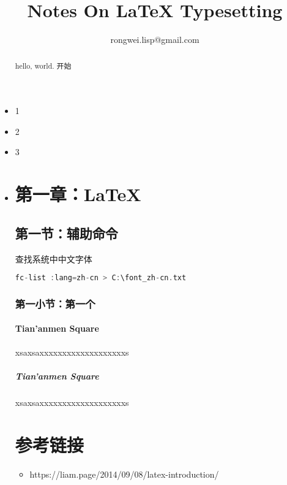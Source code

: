 \documentclass[UTF8]{ctexart}
\begin{document}
\title{Notes On LaTeX Typesetting}
\author{rongwei.lisp@gmail.com}
\maketitle
\tableofcontents

\begin{abstract}
	hello, world. 开始
\end{abstract}

\begin{itemize}
	\item 1
	\item 2
	\item 3
	\item 
\section{第一章：LaTeX}

\subsection{第一节：辅助命令}
查找系统中中文字体

\begin{lstlisting}[language={c}]
fc-list :lang=zh-cn > C:\font_zh-cn.txt
\end{lstlisting}

\subsubsection{第一小节：第一个}

\paragraph{Tian'anmen Square}
xsaxsaxxxxxxxxxxxxxxxxxxxs
\subparagraph{Tian'anmen Square}
xsaxsaxxxxxxxxxxxxxxxxxxxs

\section{参考链接}
\begin{itemize}
	\item https://liam.page/2014/09/08/latex-introduction/
\end{itemize}

\end{itemize}
\end{document}
